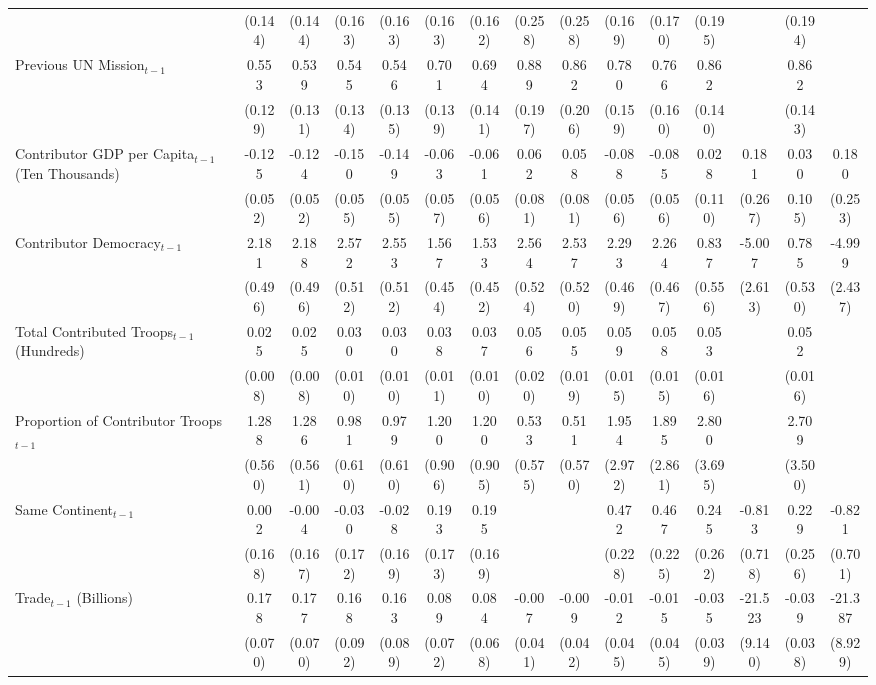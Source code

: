 \begin{table}[htbp]
\begin{tabular}{l*{14}{c}}
&(0.144)&(0.144)&(0.163)&(0.163)&(0.163)&(0.162)&(0.258)&(0.258)&(0.169)&(0.170)&(0.195)&&(0.194)\\
[0.5em]
Previous UN Mission$_{t-1}$ &0.553\sym{**}&0.539\sym{**}&0.545\sym{**}&0.546\sym{**}&0.701\sym{**}&0.694\sym{**}&0.889\sym{**}&0.862\sym{**}&0.780\sym{**}&0.766\sym{**}&0.862\sym{**}&&0.862\sym{**}\\
&(0.129)&(0.131)&(0.134)&(0.135)&(0.139)&(0.141)&(0.197)&(0.206)&(0.159)&(0.160)&(0.140)&&(0.143)\\
[0.5em]
Contributor GDP per Capita$_{t-1}$ (Ten Thousands)&-0.125\sym{*}&-0.124\sym{*}&-0.150\sym{**}&-0.149\sym{**}&-0.063&-0.061&0.062&0.058&-0.088&-0.085&0.028&0.181&0.030&0.180\\
&(0.052)&(0.052)&(0.055)&(0.055)&(0.057)&(0.056)&(0.081)&(0.081)&(0.056)&(0.056)&(0.110)&(0.267)&0.105)&(0.253)\\
[0.5em]
Contributor Democracy$_{t-1}$ &2.181\sym{**}&2.188\sym{**}&2.572\sym{**}&2.553\sym{**}&1.567\sym{**}&1.533\sym{**}&2.564\sym{**}&2.537\sym{**}&2.293\sym{**}&2.264\sym{**}&0.837&-5.007\sym{\dagger}&0.785&-4.999\sym{*}\\
&(0.496)&(0.496)&(0.512)&(0.512)&(0.454)&(0.452)&(0.524)&(0.520)&(0.469)&(0.467)&(0.556)&(2.613)&(0.530)&(2.437)\\
[0.5em]
Total Contributed Troops$_{t-1}$ (Hundreds) &0.025\sym{**}&0.025\sym{**}&0.030\sym{**}&0.030\sym{**}&0.038\sym{**}&0.037\sym{**}&0.056\sym{**}&0.055\sym{**}&0.059\sym{**}&0.058\sym{**}&0.053\sym{**}&&0.052\sym{**}\\
&(0.008)&(0.008)&(0.010)&(0.010)&(0.011)&(0.010)&(0.020)&(0.019)&(0.015)&(0.015)&(0.016)&&(0.016)\\
[0.5em]
Proportion of Contributor Troops$_{t-1}$ &1.288\sym{*}&1.286\sym{*}&0.981&0.979&1.200&1.200&0.533&0.511&1.954&1.895&2.800&&2.709\\
&(0.560)&(0.561)&(0.610)&(0.610)&(0.906)&(0.905)&(0.575)&(0.570)&(2.972)&(2.861)&(3.695)&&(3.500)\\
[0.5em]
Same Continent$_{t-1}$ &0.002&-0.004&-0.030&-0.028&0.193&0.195&&&0.472\sym{*}&0.467\sym{*}&0.245&-0.813&0.229&-0.821\\
&(0.168)&(0.167)&(0.172)&(0.169)&(0.173)&(0.169)&&&(0.228)&(0.225)&(0.262)&(0.718)&(0.256)&(0.701)\\
[0.5em]
Trade$_{t-1}$ (Billions) &0.178\sym{*}&0.177\sym{*}&0.168\sym{\dagger}&0.163\sym{\dagger}&0.089&0.084&-0.007&-0.009&-0.012&-0.015&-0.035&-21.523\sym{*}&-0.039&-21.387\sym{*}\\
&(0.070)&(0.070)&(0.092)&(0.089)&(0.072)&(0.068)&(0.041)&(0.042)&(0.045)&(0.045)&(0.039)&(9.140)&(0.038)&(8.929)\\

\end{tabular}
\end{table}

